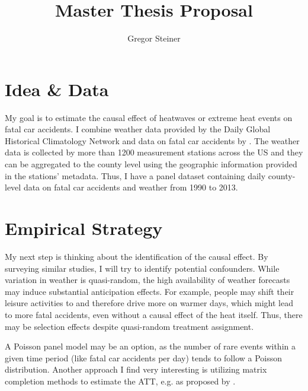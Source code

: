 \documentclass[11pt]{article}
\author{Gregor Steiner}
\title{Master Thesis Proposal}
\begin{document}
\maketitle

\section*{Idea \& Data}

My goal is to estimate the causal effect of heatwaves or extreme heat events on fatal car accidents. I combine weather data provided by the Daily Global Historical Climatology Network \citep{Menne_2012} and data on fatal car accidents by \citet{Smith_2016}. The weather data is collected by more than 1200 measurement stations across the US and they can be aggregated to the county level using the geographic information provided in the stations' metadata. Thus, I have a panel dataset containing daily county-level data on fatal car accidents and weather from 1990 to 2013.

\section*{Empirical Strategy}

My next step is thinking about the identification of the causal effect. By surveying similar studies, I will try to identify potential confounders. While variation in weather is quasi-random, the high availability of weather forecasts may induce substantial anticipation effects. For example, people may shift their leisure activities to and therefore drive more on warmer days, which might lead to more fatal accidents, even without a causal effect of the heat itself. Thus, there may be selection effects despite quasi-random treatment assignment.

A Poisson panel model may be an option, as the number of rare events within a given time period (like fatal car accidents per day) tends to follow a Poisson distribution. Another approach I find very interesting is utilizing matrix completion methods to estimate the ATT, e.g. as proposed by \citet{Athey_2021}.







\end{document}

